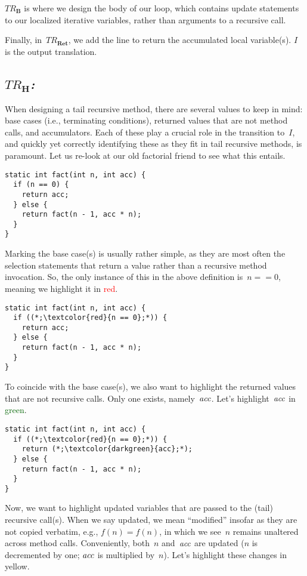 \emph{$TR_\mathbf{B}$} is where we design the body of our loop, which contains update statements to our localized iterative variables, rather than arguments to a recursive call.

Finally, in~\emph{$TR_\mathbf{Ret}$}, we add the line to return the accumulated local variable(s). $I$ is the output translation.

\subsection{\emph{$TR_\mathbf{H}$:}} When designing a tail recursive method, there are several values to keep in mind: base cases (i.e., terminating conditions), returned values that are not method calls, and accumulators. 
Each of these play a crucial role in the transition to~$I$, and quickly yet correctly identifying these as they fit in tail recursive methods, is paramount. 
Let us re-look at our old factorial friend to see what this entails.

\begin{lstlisting}[language=MyJava]
static int fact(int n, int acc) {
  if (n == 0) {
    return acc;
  } else {
    return fact(n - 1, acc * n);
  }
}
\end{lstlisting}

Marking the base case(s) is usually rather simple, as they are most often the selection statements that return a value rather than a recursive method invocation. 
So, the only instance of this in the above definition is~$n == 0$, meaning we highlight it in \textcolor{red}{red}.

\begin{lstlisting}[language=MyJava]
static int fact(int n, int acc) {
  if ((*;\textcolor{red}{n == 0};*)) {
    return acc;
  } else {
    return fact(n - 1, acc * n);
  }
}
\end{lstlisting}

To coincide with the base case(s), we also want to highlight the returned values that are not recursive calls. 
Only one exists, namely~$\emph{acc}$. 
Let's highlight~$\emph{acc}$ in \textcolor{darkgreen}{green}.

\begin{lstlisting}[language=MyJava]
static int fact(int n, int acc) {
  if ((*;\textcolor{red}{n == 0};*)) {
    return (*;\textcolor{darkgreen}{acc};*);
  } else {
    return fact(n - 1, acc * n);
  }
}
\end{lstlisting}

Now, we want to highlight updated variables that are passed to the (tail) recursive call(s). 
When we say updated, we mean ``modified'' insofar as they are not copied verbatim, e.g., $f(n) = f(n)$, in which we see~$n$ remains unaltered across method calls. 
Conveniently, both~$n$ and~$\emph{acc}$ are updated ($n$ is decremented by one; $\emph{acc}$ is multiplied by~$n$). 
Let's highlight these changes in \textcolor{darkyellow}{yellow}. 

